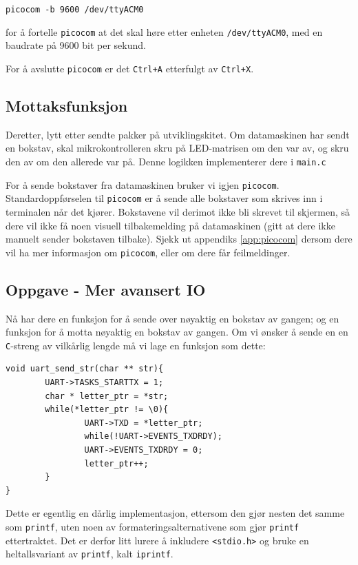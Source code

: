 \verb|picocom -b 9600 /dev/ttyACM0|

for å fortelle \verb|picocom| at det skal høre etter enheten \verb|/dev/ttyACM0|, med en baudrate på 9600 bit per sekund.

For å avslutte \verb|picocom| er det \verb|Ctrl+A| etterfulgt av \verb|Ctrl+X|.

\subsection{Mottaksfunksjon}
Deretter, lytt etter sendte pakker på utviklingskitet. Om datamaskinen har sendt en bokstav, skal mikrokontrolleren skru på LED-matrisen om den var av, og skru den av om den allerede var på. Denne logikken implementerer dere i \verb|main.c|

For å sende bokstaver fra datamaskinen bruker vi igjen \verb|picocom|. Standardoppførselen til \verb|picocom| er å sende alle bokstaver som skrives inn i terminalen når det kjører. Bokstavene vil derimot ikke bli skrevet til skjermen, så dere vil ikke få noen visuell tilbakemelding på datamaskinen (gitt at dere ikke manuelt sender bokstaven tilbake). Sjekk ut appendiks \ref{app:picocom} dersom dere vil ha mer informasjon om \verb|picocom|, eller om dere får feilmeldinger.


\subsection{Oppgave - Mer avansert IO}

Nå har dere en funksjon for å sende over nøyaktig en bokstav av gangen; og en funksjon for å motta nøyaktig en bokstav av gangen. Om vi ønsker å sende en en \verb|C|-streng av vilkårlig lengde må vi lage en funksjon som dette:

\begin{lstlisting}
void uart_send_str(char ** str){
        UART->TASKS_STARTTX = 1;
        char * letter_ptr = *str;
        while(*letter_ptr != \0){
                UART->TXD = *letter_ptr;
                while(!UART->EVENTS_TXDRDY);
                UART->EVENTS_TXDRDY = 0;
                letter_ptr++;
        }
}
\end{lstlisting}


Dette er egentlig en dårlig implementasjon, ettersom den gjør nesten det samme som \verb|printf|, uten noen av formateringsalternativene som gjør \verb|printf| ettertraktet. Det er derfor litt lurere å inkludere \verb|<stdio.h>| og bruke en heltallsvariant av \verb|printf|, kalt \verb|iprintf|.


